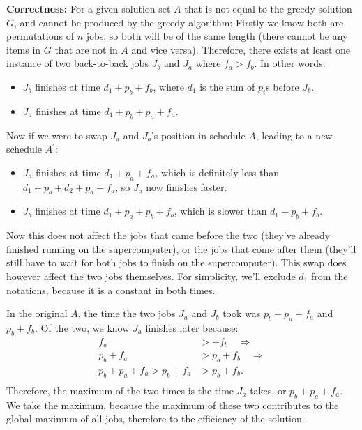 \documentclass[12pt, letterpaper]{article}
\begin{document}
\vspace{7.5mm}
\noindent \textbf{Correctness:}
For a given solution set $A$ that is not equal to the greedy solution $G$, and cannot be produced by the greedy algorithm:
Firstly we know both are permutations of $n$ jobs, so both will be of the same length (there cannot be any items in $G$ that are not in $A$ and vice versa).
Therefore, there exists at least one instance of two back-to-back jobs $J_b$ and $J_a$ where $f_a > f_b$.
In other words: 

\begin{itemize}
    \item $J_b$ finishes at time $d_1 + p_b + f_b$, where $d_1$ is the sum of $p_i$s before $J_b$.
    \item $J_a$ finishes at time $d_1 + p_b + p_a + f_a$.
\end{itemize}

\noindent Now if we were to swap $J_a$ and $J_b$'s position in schedule $A$, leading to a new schedule $A^{\prime}$:
\begin{itemize}
    \item $J_a$ finishes at time $d_1 + p_a + f_a$, which is definitely less than $d_1 + p_b + d_2 + p_a + f_a$, so $J_a$ now finishes faster.
    \item $J_b$ finishes at time $d_1 + p_a + p_b + f_b$, which is slower than $d_1 + p_b + f_b$.
\end{itemize}
Now this does not affect the jobs that came before the two (they've already finished running on the supercomputer), or the jobs that come after them (they'll still have to wait for both jobs to finish on the supercomputer).
This swap does however affect the two jobs themselves.
For simplicity, we'll exclude $d_1$ from the notations, because it is a constant in both times.

\noindent In the original $A$, the time the two jobs $J_a$ and $J_b$ took was $p_b + p_a + f_a$ and $p_b + f_b$.
Of the two, we know $J_a$ finishes later because:
\begin{align*}
    f_a &>  + f_b \quad \Longrightarrow\\
    p_b + f_a &> p_b + f_b \quad \Longrightarrow\\
    p_b + p_a + f_a > p_b + f_a &> p_b + f_b .\\
\end{align*}
Therefore, the maximum of the two times is the time $J_a$ takes, or $p_b + p_a + f_a$.
We take the maximum, because the maximum of these two contributes to the global maximum of all jobs, therefore to the efficiency of the solution.
\end{document}

